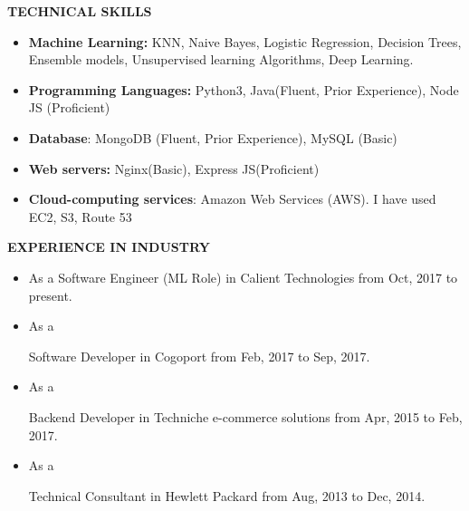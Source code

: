 \documentclass[12pt]{article}
\begin{document}
\vspace{\baselineskip}
\begin{FlushLeft}
\textbf{TECHNICAL SKILLS}
\end{FlushLeft}\par

\begin{itemize}
	\item {\fontsize{14pt}{16.8pt}\selectfont \textbf{Machine Learning: }KNN, Naive Bayes, Logistic Regression, Decision Trees, Ensemble models, Unsupervised learning Algorithms, Deep Learning.\par}\par

	\item {\fontsize{14pt}{16.8pt}\selectfont \textbf{Programming Languages: }Python3, Java(Fluent, Prior Experience), Node JS (Proficient)\par}\par

	\item \textbf{Database}: MongoDB (Fluent, Prior Experience), MySQL (Basic)\par

	\item \textbf{Web servers:} Nginx(Basic), Express JS(Proficient)\par

	\item \textbf{Cloud-computing services}: Amazon Web Services (AWS). I have used EC2, S3, Route 53
\end{itemize}\par


\vspace{\baselineskip}
\begin{FlushLeft}
\textbf{EXPERIENCE IN INDUSTRY}
\end{FlushLeft}\par

\begin{itemize}
	\item {\fontsize{13pt}{15.6pt}\selectfont As a Software Engineer (ML Role) in Calient Technologies from Oct, 2017 to present.\par}\par

	\item As a {\fontsize{13pt}{15.6pt}\selectfont Software Developer in Cogoport from Feb, 2017 to Sep, 2017.\par}\par

	\item As a {\fontsize{13pt}{15.6pt}\selectfont Backend Developer in Techniche e-commerce solutions from Apr, 2015 to Feb, 2017.\par}\par

	\item As a {\fontsize{13pt}{15.6pt}\selectfont Technical Consultant in Hewlett Packard from Aug, 2013 to Dec, 2014.\par}
\end{itemize}\par
\end{document}

